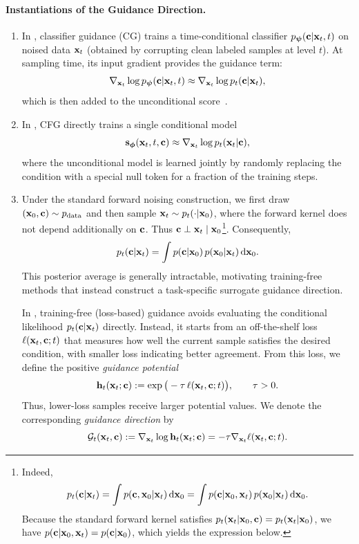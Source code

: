 \paragraph{Instantiations of the Guidance Direction.}
\begin{enumerate}[leftmargin=*]
\item {} In , classifier guidance (CG) trains a time-conditional classifier
$p_{{\bm{\psi}}}({\mathbf{c}} | {\mathbf{x}}_t, t)$ on noised data ${\mathbf{x}}_t$ (obtained by corrupting
clean labeled samples at level $t$). At sampling time, its input gradient
provides the guidance term:
\[
\nabla_{{\mathbf{x}}_t}\log p_{{\bm{\psi}}}({\mathbf{c}} | {\mathbf{x}}_t, t)
 \approx  \nabla_{{\mathbf{x}}_t}\log p_t({\mathbf{c}} | {\mathbf{x}}_t),
\]
which is then added to the unconditional score~\citep{dhariwal2021diffusion}.
\item {} In , CFG directly trains a single conditional model
\[
{\mathbf{s}}_{{\bm{\phi}}}({\mathbf{x}}_t,t,{\mathbf{c}}) \approx \nabla_{{\mathbf{x}}_t}\log p_t({\mathbf{x}}_t|{\mathbf{c}}),
\]
where the unconditional model is learned jointly by randomly replacing the condition with a special null token for a fraction of the training steps.
\item {}
Under the standard forward noising construction, we first draw
$({\mathbf{x}}_0,{\mathbf{c}})\sim p_{\mathrm{data}}$ and then sample
${\mathbf{x}}_t\sim p_t(\cdot|{\mathbf{x}}_0)$, where the forward kernel does not depend
additionally on ${\mathbf{c}}$. Thus
${\mathbf{c}}\perp{\mathbf{x}}_t\mid{\mathbf{x}}_0$\footnote{
Indeed,
\[
p_t({\mathbf{c}}|{\mathbf{x}}_t)
=
\int
p({\mathbf{c}},{\mathbf{x}}_0|{\mathbf{x}}_t)\,\mathrm d{\mathbf{x}}_0
=
\int
p({\mathbf{c}}|{\mathbf{x}}_0,{\mathbf{x}}_t)\,
p({\mathbf{x}}_0|{\mathbf{x}}_t)\,\mathrm d{\mathbf{x}}_0.
\]
Because the standard forward kernel satisfies
$p_t({\mathbf{x}}_t|{\mathbf{x}}_0,{\mathbf{c}})=p_t({\mathbf{x}}_t|{\mathbf{x}}_0)$,
we have
$p({\mathbf{c}}|{\mathbf{x}}_0,{\mathbf{x}}_t)=p({\mathbf{c}}|{\mathbf{x}}_0)$,
which yields the expression below.
}.
Consequently,
\[
p_t({\mathbf{c}}|{\mathbf{x}}_t)
=
\int
p({\mathbf{c}}|{\mathbf{x}}_0)\,
p({\mathbf{x}}_0|{\mathbf{x}}_t)\,
\mathrm d{\mathbf{x}}_0.
\]
This posterior average is generally intractable, motivating training-free
methods that instead construct a task-specific surrogate guidance direction.

In , training-free (loss-based) guidance avoids evaluating the
conditional likelihood $p_t({\mathbf{c}}|{\mathbf{x}}_t)$ directly. Instead, it starts from an
off-the-shelf loss $\ell({\mathbf{x}}_t,{\mathbf{c}};t)$ that measures how well the current
sample satisfies the desired condition, with smaller loss indicating better
agreement. From this loss, we define the positive \emph{guidance potential}
\[
{\mathbf{h}}_t({\mathbf{x}}_t;{\mathbf{c}})
:=
\exp\big(-\tau\,\ell({\mathbf{x}}_t,{\mathbf{c}};t)\big),
\qquad \tau>0.
\]
Thus, lower-loss samples receive larger potential values. We denote the
corresponding \emph{guidance direction} by
\[
\mathcal{G}_t({\mathbf{x}}_t,{\mathbf{c}})
:=
\nabla_{{\mathbf{x}}_t}\log {\mathbf{h}}_t({\mathbf{x}}_t;{\mathbf{c}})
=
-\tau\nabla_{{\mathbf{x}}_t}\ell({\mathbf{x}}_t,{\mathbf{c}};t).
\]


\end{enumerate}
